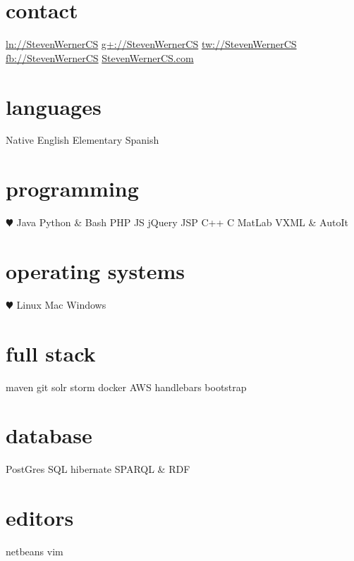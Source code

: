 \documentclass[]{friggeri-cv} %
\begin{document}


\begin{aside1} 
\section{contact}
\href{http://linkedin.com/in/StevenWernerCS}{ln://StevenWernerCS}
\href{https://plus.google.com/+StevenWernerCS}{g+://StevenWernerCS}
\href{http://www.twitter.com/StevenWernerCS}{tw://StevenWernerCS}
\href{http://facebook.com/StevenWernerCS}{fb://StevenWernerCS}
\href{http://www.StevenWernerCS.com}{StevenWernerCS.com}
\section{languages}
Native English
Elementary Spanish
\section{programming}
{\color{red} $\varheartsuit$} Java Python \& Bash
PHP JS jQuery JSP
C++ C MatLab
VXML \& AutoIt %
\section{operating systems}
{\color{red} $\varheartsuit$} Linux Mac 
Windows
\section{full stack}
maven git
solr storm
docker AWS
handlebars bootstrap
\section{database}
PostGres SQL
hibernate
SPARQL \& RDF
\section{editors}
netbeans vim
\end{aside1}
\end{document}
